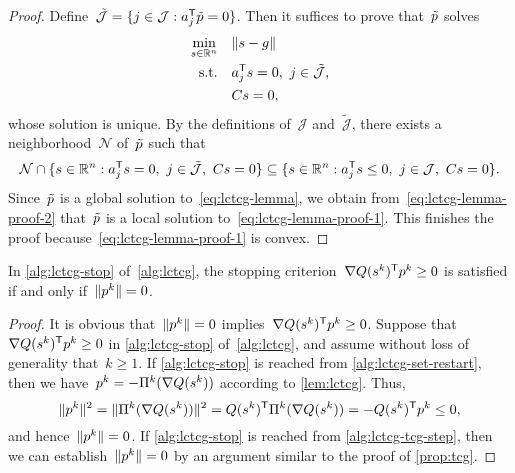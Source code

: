 \begin{proof}
    Define~$\tilde{\mathcal{J}} = \set{j \in \mathcal{J} : a_j^{\T} \tilde{\pstep} = 0}$.
    Then it suffices to prove that~$\tilde{\pstep}$ solves
    \begin{subequations}
        \label{eq:lctcg-lemma-proof-1}
        \begin{align}
            \min_{\sstep \in \R^n}  & \quad \norm{\sstep - g}\\
            \text{s.t.}             & \quad a_j^{\T} \sstep = 0, ~ j \in \tilde{\mathcal{J}},\\
                                    & \quad C \sstep = 0,
        \end{align}
    \end{subequations}
    whose solution is unique.
    By the definitions of~$\mathcal{J}$ and~$\tilde{\mathcal{J}}$, there exists a neighborhood~$\mathcal{N}$ of~$\tilde{\pstep}$ such that
    \begin{equation}
        \label{eq:lctcg-lemma-proof-2}
        \mathcal{N} \cap \set{\sstep \in \R^n : a_j^{\T} \sstep = 0, ~ j \in \tilde{\mathcal{J}}, ~ C \sstep = 0} \subseteq \set{\sstep \in \R^n : a_j^{\T} \sstep \le 0, ~ j \in \mathcal{J}, ~ C \sstep = 0}.
    \end{equation}
    Since~$\tilde{\pstep}$ is a global solution to~\cref{eq:lctcg-lemma}, we obtain from~\cref{eq:lctcg-lemma-proof-2} that~$\tilde{\pstep}$ is a local solution to~\cref{eq:lctcg-lemma-proof-1}.
    This finishes the proof because~\cref{eq:lctcg-lemma-proof-1} is convex.
\end{proof}

\begin{proposition}
    \label{prop:lctcg}
    In \cref{alg:lctcg-stop} of~\cref{alg:lctcg}, the stopping criterion~$\nabla Q (\sstep[k])^{\T} \pstep[k] \ge 0$ is satisfied if and only if~$\norm{\pstep[k]} = 0$.
\end{proposition}

\begin{proof}
    It is obvious that~$\norm{\pstep[k]} = 0$ implies~$\nabla Q (\sstep[k])^{\T} \pstep[k] \ge 0$.
    Suppose that~$\nabla Q (\sstep[k])^{\T} \pstep[k] \ge 0$ in \cref{alg:lctcg-stop} of~\cref{alg:lctcg}, and assume without loss of generality that~$k \ge 1$.
    If \cref{alg:lctcg-stop} is reached from \cref{alg:lctcg-set-restart}, then we have~$\pstep[k] = -\Pi^k(\nabla Q(\sstep[k]))$ according to \cref{lem:lctcg}.
    Thus,
    \begin{equation*}
        \norm{\pstep[k]}^2 = \norm{\Pi^k(\nabla Q(\sstep[k]))}^2 = Q (\sstep[k])^{\T}  \Pi^k(\nabla Q(\sstep[k])) = - Q (\sstep[k])^{\T}  \pstep[k] \le 0,
    \end{equation*}
    and hence~$\norm{\pstep[k]} = 0$.
    If \cref{alg:lctcg-stop} is reached from \cref{alg:lctcg-tcg-step}, then we can establish~$\norm{\pstep[k]} = 0$ by an argument similar to the proof of \cref{prop:tcg}.
\end{proof}

